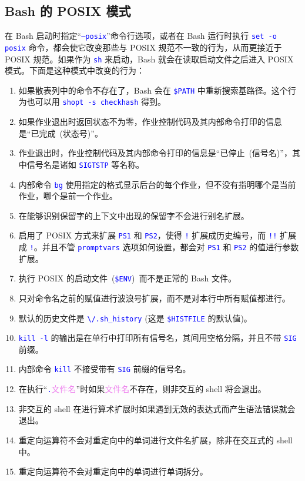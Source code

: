 \documentclass[openany,notitlepage]{book}
\newcommand{\code}[1]{\textcolor{blue}{{\tt #1}}}
\newcommand{\hs}[1]{{\textcolor{violet}{#1}}}
\begin{document}
\begin{CJK}{UTF8}{song}
\section{Bash 的 POSIX 模式}\label{posix-mode} %
在 Bash 启动时指定``\code{--posix}''命令行选项，或者在 Bash 运行时执行 \code{set -o posix} 命令，都会使它改变那些与 POSIX 规范不一致的行为，从而更接近于 POSIX 规范。如果作为 \code{sh} 来启动，Bash 就会在读取启动文件之后进入 POSIX 模式。下面是这种模式中改变的行为：
\begin{enumerate}
    \item 如果散表列中的命令不存在了，Bash 会在 \code{\$PATH} 中重新搜索基路径。这个行为也可以用 \code{shopt -s checkhash} 得到。
    \item 如果作业退出时返回状态不为零，作业控制代码及其内部命令打印的信息是``已完成~(状态号)''。
    \item 作业退出时，作业控制代码及其内部命令打印的信息是``已停止~(信号名)''，其中信号名是诸如 \code{SIGTSTP} 等名称。
    \item 内部命令 \code{bg} 使用指定的格式显示后台的每个作业，但不没有指明哪个是当前作业，哪个是前一个作业。
    \item 在能够识别保留字的上下文中出现的保留字不会进行别名扩展。
    \item 启用了 POSIX 方式来扩展 \code{PS1} 和 \code{PS2}，使得 \code{!} 扩展成历史编号，而 \code{!!} 扩展成 \code{!}。并且不管 \code{promptvars} 选项如何设置，都会对 \code{PS1} 和 \code{PS2} 的值进行参数扩展。
    \item 执行 POSIX 的启动文件~(\code{\$ENV})~而不是正常的 Bash 文件。
    \item 只对命令名之前的赋值进行波浪号扩展，而不是对本行中所有赋值都进行。
    \item 默认的历史文件是 \code{\textbackslash{}/.sh\_history} (这是 \code{\$HISTFILE} 的默认值)。
    \item \code{kill -l} 的输出是在单行中打印所有信号名，其间用空格分隔，并且不带 \code{SIG} 前缀。
    \item 内部命令 \code{kill} 不接受带有 \code{SIG} 前缀的信号名。
    \item 在执行``\code{.\textvisiblespace}\hs{文件名}''时如果\hs{文件名}不存在，则非交互的 shell 将会退出。
    \item 非交互的 shell 在进行算术扩展时如果遇到无效的表达式而产生语法错误就会退出。
    \item 重定向运算符不会对重定向中的单词进行文件名扩展，除非在交互式的 shell 中。
    \item 重定向运算符不会对重定向中的单词进行单词拆分。

\end{enumerate}
\end{CJK}
\end{document}
